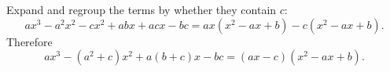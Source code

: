 Expand and regroup the terms by whether they contain $c$:
\[ax^3-a^2x^2-cx^2+abx+acx-bc=ax\left(x^2-ax+b\right)-c\left(x^2-ax+b\right).\]
Therefore
\[ax^{3}-(a^{2}+c)x^{2}+a(b+c)x-bc=\boxed{(ax-c)(x^2-ax+b)}.\]
